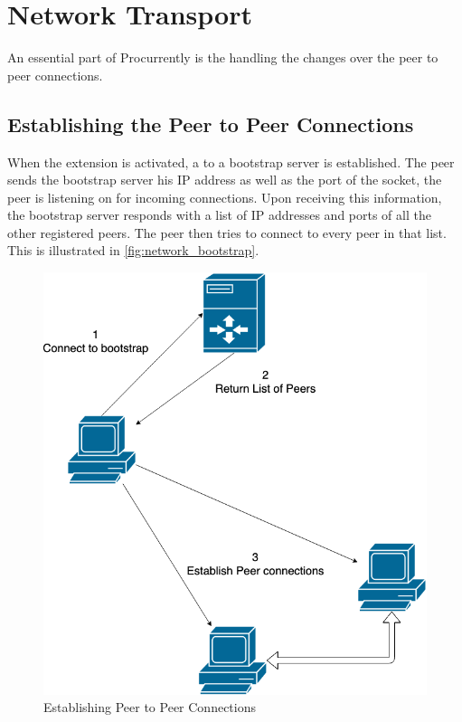 \section{Network Transport}

An essential part of Procurrently is the handling the changes over the peer to peer connections.

\subsection{Establishing the Peer to Peer Connections}
When the extension is activated, a to a bootstrap server is established. 
The peer sends the bootstrap server his IP address as well as the port of the socket, the peer is listening on for incoming connections.
Upon receiving this information, the bootstrap server responds with a list of IP addresses and ports of all the other registered peers.
The peer then tries to connect to every peer in that list.
This is illustrated in \autoref{fig:network_bootstrap}.

\begin{figure}
    \centering
    \includegraphics[width=1\linewidth]{figures/illustrations/network-bootstrap.png}
	\caption{Establishing Peer to Peer Connections}
    \label{fig:network_bootstrap}
\end{figure}

